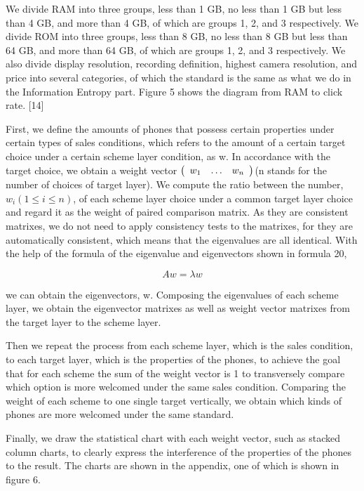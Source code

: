 We divide RAM into three groups, less than 1 GB, no less than 1 GB but less than 4 GB, and more than 4 GB, of which are groups 1, 2, and 3 respectively. We divide ROM into three groups, less than 8 GB, no less than 8 GB but less than 64 GB, and more than 64 GB, of which are groups 1, 2, and 3 respectively. We also divide display resolution, recording definition, highest camera resolution, and price into several categories, of which the standard is the same as what we do in the Information Entropy part. Figure 5 shows the diagram from RAM to click rate.  [14]

First, we define the amounts of phones that possess certain properties under certain types of sales conditions, which refers to the amount of a certain target choice under a certain scheme layer condition, as w. In accordance with the target choice, we obtain a weight vector $\left( \begin{array} { l l l } { w _ { 1 } } & { \dots } & { w _ { n } } \end{array} \right)$(n stands for the number of choices of target layer). We compute the ratio between the number, $w _ { i } ( 1 \leq i \leq n )$, of each scheme layer choice under a common target layer choice and regard it as the weight of paired comparison matrix. As they are consistent matrixes, we do not need to apply consistency tests to the matrixes, for they are automatically consistent, which means that the eigenvalues are all identical. With the help of the formula of the eigenvalue and eigenvectors shown in formula 20, 

\begin{equation}
A w = \lambda w
\end{equation}

we can obtain the eigenvectors, w. Composing the eigenvalues of each scheme layer, we obtain the eigenvector matrixes as well as weight vector matrixes from the target layer to the scheme layer. 

Then we repeat the process from each scheme layer, which is the sales condition, to each target layer, which is the properties of the phones, to achieve the goal that for each scheme the sum of the weight vector is 1 to transversely compare which option is more welcomed under the same sales condition. Comparing the weight of each scheme to one single target vertically, we obtain which kinds of phones are more welcomed under the same standard. 

Finally, we draw the statistical chart with each weight vector, such as stacked column charts, to clearly express the interference of the properties of the phones to the result. The charts are shown in the appendix, one of which is shown in figure 6.

